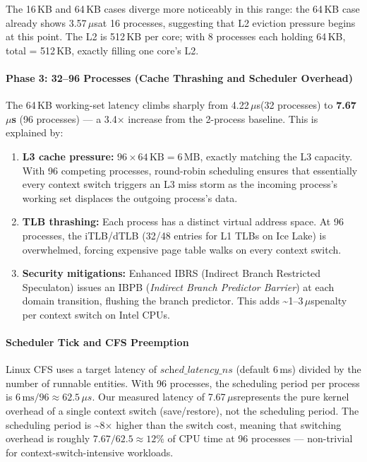 \documentclass[12pt,a4paper]{article}
\newcommand{\us}{$\mu$s}
\begin{document}
The 16\,KB and 64\,KB cases diverge more noticeably in this range: the 64\,KB
case already shows 3.57\,\us at 16 processes, suggesting that L2 eviction
pressure begins at this point. The L2 is 512\,KB per core; with 8 processes
each holding 64\,KB, total = 512\,KB, exactly filling one core's L2.

\paragraph{Phase 3: 32–96 Processes (Cache Thrashing and Scheduler Overhead)}

The 64\,KB working-set latency climbs sharply from 4.22\,\us (32 processes)
to \textbf{7.67\,\us} (96 processes) — a 3.4$\times$ increase from the
2-process baseline. This is explained by:

\begin{enumerate}[label=\arabic*.]
    \item \textbf{L3 cache pressure:} $96 \times 64\,\text{KB} = 6\,\text{MB}$,
    exactly matching the L3 capacity. With 96 competing processes, round-robin
    scheduling ensures that essentially every context switch triggers an L3 miss
    storm as the incoming process's working set displaces the outgoing process's
    data.
    \item \textbf{TLB thrashing:} Each process has a distinct virtual address
    space. At 96 processes, the iTLB/dTLB (32/48 entries for L1 TLBs on Ice
    Lake) is overwhelmed, forcing expensive page table walks on every context
    switch.
    \item \textbf{Security mitigations:} Enhanced IBRS (Indirect Branch
    Restricted Speculaton) issues an IBPB (\textit{Indirect Branch Predictor
    Barrier}) at each domain transition, flushing the branch predictor. This
    adds \textasciitilde{}1–3\,\us penalty per context switch on Intel CPUs.
\end{enumerate}

\paragraph{Scheduler Tick and CFS Preemption}

Linux CFS uses a target latency of $\textit{sched\_latency\_ns}$ (default
6\,ms) divided by the number of runnable entities. With 96 processes,
the scheduling period per process is $6\,\text{ms} / 96 \approx 62.5\,\mu s$.
Our measured latency of 7.67\,\us represents the pure kernel overhead of a
single context switch (save/restore), not the scheduling period. The scheduling
period is \textasciitilde{}8$\times$ higher than the switch cost, meaning that
switching overhead is roughly $7.67 / 62.5 \approx 12\%$ of CPU time at 96
processes — non-trivial for context-switch-intensive workloads.
\end{document}
